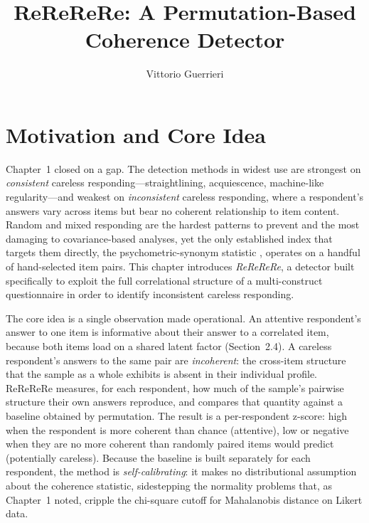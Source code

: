 \documentclass[doc,11pt,donotrepeattitle]{apa7}
\title{ReReReRe: A Permutation-Based Coherence Detector}
\author{Vittorio Guerrieri}
\affiliation{Chapter~3 of the thesis}
\begin{document}
\maketitle

\section{Motivation and Core Idea}

Chapter~1 closed on a gap. The detection methods in widest use are strongest on
\emph{consistent} careless responding---straightlining, acquiescence, machine-like
regularity---and weakest on \emph{inconsistent} careless responding, where a
respondent's answers vary across items but bear no coherent relationship to item
content. Random and mixed responding are the hardest patterns to prevent and the
most damaging to covariance-based analyses, yet the only established index that
targets them directly, the psychometric-synonym statistic
\parencite{meade2012identifying}, operates on a handful of hand-selected item
pairs. This chapter introduces \emph{ReReReRe}, a detector built specifically to
exploit the full correlational structure of a multi-construct questionnaire in
order to identify inconsistent careless responding.

The core idea is a single observation made operational. An attentive
respondent's answer to one item is informative about their answer to a
correlated item, because both items load on a shared latent factor
(Section~2.4). A careless respondent's answers to the same pair are
\emph{incoherent}: the cross-item structure that the sample as a whole exhibits
is absent in their individual profile. ReReReRe measures, for each respondent,
how much of the sample's pairwise structure their own answers reproduce, and
compares that quantity against a baseline obtained by permutation. The result is
a per-respondent z-score: high when the respondent is more coherent than chance
(attentive), low or negative when they are no more coherent than randomly paired
items would predict (potentially careless). Because the baseline is built
separately for each respondent, the method is \emph{self-calibrating}: it makes
no distributional assumption about the coherence statistic, sidestepping the
normality problems that, as Chapter~1 noted, cripple the chi-square cutoff for
Mahalanobis distance on Likert data.
\end{document}
